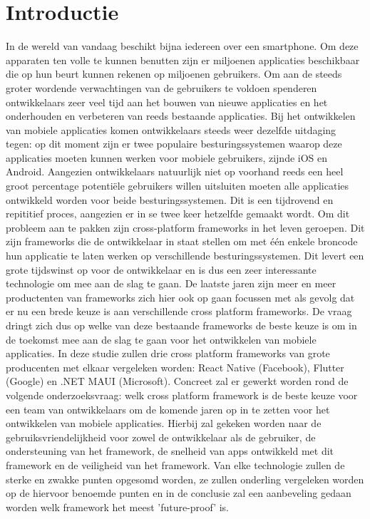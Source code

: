 
\section{Introductie} %
\label{sec:introductie}

In de wereld van vandaag beschikt bijna iedereen over een smartphone. Om deze apparaten ten volle te kunnen benutten zijn er miljoenen applicaties beschikbaar die op hun beurt kunnen rekenen op miljoenen gebruikers. Om aan de steeds groter wordende verwachtingen van de gebruikers te voldoen spenderen ontwikkelaars zeer veel tijd aan het bouwen van nieuwe applicaties en het onderhouden en verbeteren van reeds bestaande applicaties. Bij het ontwikkelen van mobiele applicaties komen ontwikkelaars steeds weer dezelfde uitdaging tegen: op dit moment zijn er twee populaire besturingssystemen waarop deze applicaties moeten kunnen werken voor mobiele gebruikers, zijnde iOS en Android. Aangezien ontwikkelaars natuurlijk niet op voorhand reeds een heel groot percentage potentiële gebruikers willen uitsluiten moeten alle applicaties ontwikkeld worden voor beide besturingssystemen. Dit is een tijdrovend en repititief proces, aangezien er in se twee keer hetzelfde gemaakt wordt. Om dit probleem aan te pakken zijn cross-platform frameworks in het leven geroepen. Dit zijn frameworks die de ontwikkelaar in staat stellen om met één enkele broncode hun applicatie te laten werken op verschillende besturingssystemen. Dit levert een grote tijdswinst op voor de ontwikkelaar en is dus een zeer interessante technologie om mee aan de slag te gaan. De laatste jaren zijn meer en meer productenten van frameworks zich hier ook op gaan focussen met als gevolg dat er nu een brede keuze is aan verschillende cross platform frameworks. De vraag dringt zich dus op welke van deze bestaande frameworks de beste keuze is om in de toekomst mee aan de slag te gaan voor het ontwikkelen van mobiele applicaties. In deze studie zullen drie cross platform frameworks van grote producenten met elkaar vergeleken worden: React Native (Facebook), Flutter (Google) en .NET MAUI (Microsoft). Concreet zal er gewerkt worden rond de volgende onderzoeksvraag: welk cross platform framework is de beste keuze voor een team van ontwikkelaars om de komende jaren op in te zetten voor het ontwikkelen van mobiele applicaties. Hierbij zal gekeken worden naar de gebruiksvriendelijkheid voor zowel de ontwikkelaar als de gebruiker, de ondersteuning van het framework, de snelheid van apps ontwikkeld met dit framework en de veiligheid van het framework. Van elke technologie zullen de sterke en zwakke punten opgesomd worden, ze zullen onderling vergeleken worden op de hiervoor benoemde punten en in de conclusie zal een aanbeveling gedaan worden welk framework het meest 'future-proof' is. 

